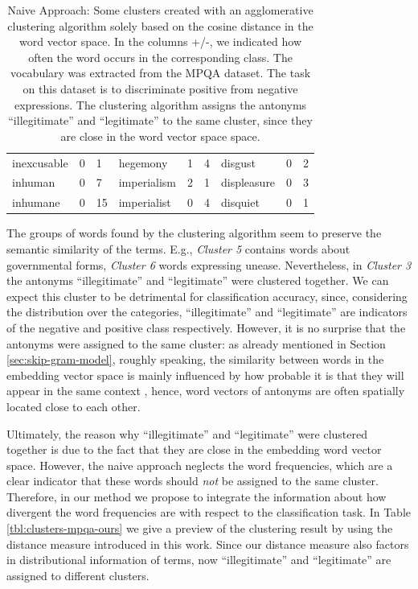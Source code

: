 \begin{table}
\begin{tabular}{lll|lll|lll}
inexcusable        & 0          & 1          & hegemony           & 1          & 4          & disgust                                      & 0          & 2          \\
inhuman            & 0          & 7          & imperialism        & 2          & 1          & displeasure                                  & 0          & 3          \\
inhumane           & 0          & 15         & imperialist        & 0          & 4          & disquiet                                     & 0          & 1         
\end{tabular}
\caption{Naive Approach: Some clusters created with an agglomerative clustering
algorithm solely based on the cosine distance in the word vector space. In the columns +/-, we indicated how often 
the word occurs in the corresponding class. The vocabulary was extracted from
the MPQA dataset. The task on this dataset is to discriminate positive from 
negative expressions. The clustering algorithm assigns the antonyms ``illegitimate'' and ``legitimate'' to the same cluster,
since they are close in the word vector space space. }
\label{tbl:clusters-mpqa}
\end{table}
The groups of words found by the clustering algorithm seem to preserve the semantic similarity of the terms.
E.g., \emph{Cluster 5} contains words about governmental forms, \emph{Cluster
6} words expressing unease. Nevertheless, in \emph{Cluster 3} the antonyms
``illegitimate'' and ``legitimate'' were clustered together. We can expect this cluster
to be detrimental for classification accuracy, since, considering the 
distribution over the categories, ``illegitimate'' and ``legitimate'' are
indicators of the negative and positive class respectively.
However, it is no surprise that the antonyms were assigned to the same
cluster: as already mentioned in Section \ref{sec:skip-gram-model}, roughly
speaking, the similarity between words in the embedding vector space is mainly
influenced by how probable it is that they will appear in the same context
\cite{lu2015deep}, hence, word vectors of antonyms are often spatially located
close to each other. 

Ultimately, the reason why ``illegitimate'' and ``legitimate'' were clustered 
together is due to the fact that they are close in the embedding word vector space.
However, the naive approach neglects the word frequencies, which are a clear
indicator that these words should \emph{not} be assigned to the same cluster. 
Therefore, in our method we propose to integrate the information about
how divergent the word frequencies are with respect to the classification task.
In Table \ref{tbl:clusters-mpqa-ours} we give a preview of the clustering result
by using the distance measure introduced in this work. Since our distance measure 
also factors in distributional information
of terms, now ``illegitimate'' and ``legitimate'' are assigned to different
clusters.

